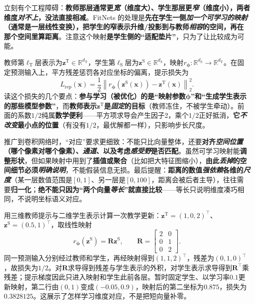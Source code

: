 立刻有个工程障碍：\textbf{教师那层通常更\emph{宽}（维度大）、学生那层更\emph{窄}（维度小），两者维度\emph{对不上}，没法直接相减}。FitNets 的处理是\textbf{先在学生一侧\emph{加一个可学习的映射}（通常是一层线性变换），把学生的窄表示\textbf{升维/投影到与教师\emph{相容}的空间}，再在那个空间里算距离}。注意这个映射\textbf{是学生侧的“适配垫片”}，只为了让比较成为可能。

教师第$\ell_{\mathrm{T}}$层表示为$\bm{z}^{\mathrm{T}}\in\mathbb{R}^{d_{\mathrm{T}}}$，学生第$\ell_{\mathrm{S}}$层为$\bm{z}^{\mathrm{S}}\in\mathbb{R}^{d_{\mathrm{S}}}$，映射$r_{\bm{\phi}}:\mathbb{R}^{d_{\mathrm{S}}}\to\mathbb{R}^{d_{\mathrm{T}}}$。在固定预测输入上，平方残差惩罚各对应坐标的偏离，提示损失为
\begin{equation}
  L_{\mathrm{rep}}(\bm{x})
   =\frac{1}{2}\left\|
      r_{\bm{\phi}}(\bm{z}^{\mathrm{S}}(\bm{x}))
        -\bm{z}^{\mathrm{T}}(\bm{x})
     \right\|_2^2.
  \label{eq:ket-integration-feature-loss}
\end{equation}
读这个损失的几个要点：\textbf{参与学习（被优化）的是“映射参数$\bm{\phi}$”和“生成学生表示的那些模型参数”}，而\textbf{教师表示$\bm{z}^{\mathrm{T}}$是\emph{固定}的目标}（教师冻住，不被学生牵动）。前面的系数$1/2$纯属\textbf{数学便利}——平方项求导会产生因子2，乘个$1/2$正好抵消，\textbf{它\emph{不改变}最小点的位置}（有没有$1/2$，最优解都一样），只影响步长尺度。

推广到卷积网络时，“对应”要求更细致：不能只比向量整体，还要\textbf{对齐\emph{空间位置}（哪个像素对哪个像素）、\emph{通道}、以及考虑\emph{感受野}是否匹配}。虽然可学习映射能\textbf{调整形状}，但如果映射中用到了\textbf{插值或聚合}（比如把大特征图缩小），\textbf{由此\emph{丢掉}的空间细节必须\emph{明确说明}}，不能假装信息无损。最后提醒：\textbf{距离的数值\emph{强依赖}各维的\emph{尺度}}（某一层数值范围是$[0,1]$、另一层是$[0,100]$，距离会被后者主导），往往需要\textbf{归一化}；\textbf{绝不能只因为“两个向量\emph{等长}”就直接比较}——等长只说明维度凑巧相同，不说明坐标语义对应。

用三维教师提示与二维学生表示计算一次教学更新：$\bm{z}^{\mathrm{T}}=(1,0,2)^\top$、$\bm{z}^{\mathrm{S}}=(0.5,1)^\top$，取线性映射
\[
  r_{\bm{\phi}}(\bm{z}^{\mathrm{S}})=\bm{R}\bm{z}^{\mathrm{S}},
  \qquad
  \bm{R}=\begin{bmatrix}2&0\\0&1\\0&2\end{bmatrix}.
\]
同一预测输入分别经过教师和学生，再经映射得到$(1,1,2)^\top$，残差为$(0,1,0)^\top$，故损失为$1/2$。对$\bm{R}$求导得到残差与学生表示的外积，对学生表示求导得到$\bm{R}^{\top}$乘残差；提示梯度因此只进入映射和学生此前各层。暂时固定学生、以学习率$0.1$更新映射，第二行由$(0,1)$变成$(-0.05,0.9)$，映射后的第二坐标为$0.875$，损失为$0.3828125$。这展示了怎样学习维度对应，不是把短向量补零。

